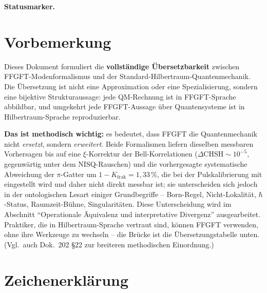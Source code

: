 
\medskip\noindent\textbf{Statusmarker.}


\section*{Vorbemerkung}

Dieses Dokument formuliert die \textbf{vollständige Übersetzbarkeit}
zwischen FFGFT-Modenformalismus und der Standard-Hilbertraum-Quanten\-mechanik.
Die Übersetzung ist nicht eine Approximation oder eine Spezialisierung,
sondern eine bijektive Strukturaussage: jede QM-Rechnung ist in
FFGFT-Sprache abbildbar, und umgekehrt jede FFGFT-Aussage über
Quantensysteme ist in Hilbertraum-Sprache reproduzierbar.

\textbf{Das ist methodisch wichtig:} es bedeutet, dass FFGFT die
Quantenmechanik nicht \emph{ersetzt}, sondern \emph{erweitert}. Beide
Formalismen liefern dieselben messbaren Vorhersagen bis auf eine
$\xi$-Korrektur der Bell-Korrelationen ($\Delta\text{CHSH} \sim 10^{-5}$,
gegenwärtig unter dem NISQ-Rauschen) und die vorhergesagte systematische
Abweichung der $\pi$-Gatter um $1 - K_{\text{frak}} = 1{,}33\,\%$,
die bei der Pulskalibrierung mit eingestellt wird und daher nicht
direkt messbar ist;
sie unterscheiden sich jedoch in der ontologischen Lesart einiger
Grundbegriffe -- Born-Regel, Nicht-Lokalität, $\hbar$-Status,
Raumzeit-Bühne, Singularitäten. Diese Unterscheidung wird im Abschnitt
\enquote{Operationale Äquivalenz und interpretative Divergenz}
ausgearbeitet. Praktiker, die in Hilbertraum-Sprache vertraut sind,
können FFGFT verwenden, ohne ihre Werkzeuge zu wechseln -- die Brücke
ist die Übersetzungstabelle unten. (Vgl.\ auch Dok.~202 §22 zur
breiteren methodischen Einordnung.)

\section*{Zeichenerklärung}

